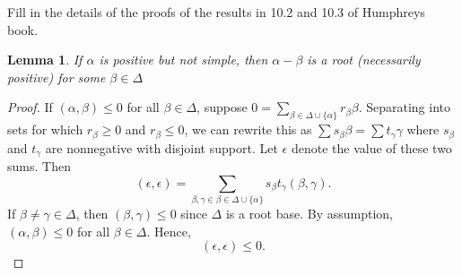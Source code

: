 \documentclass{article}
\newtheorem{lem}[thm]{Lemma}
\begin{document}
\p Fill in the details of the proofs of the results in 10.2 and 10.3 of Humphreys book.

\begin{lem} If $\alpha$ is positive but not simple, then $\alpha - \beta$ is a root 
(necessarily positive) for some $\beta \in \Delta$
\end{lem}
\begin{proof}
If $(\alpha, \beta) \le 0$ for all $\beta \in \Delta$, suppose
$0 = \sum_{\beta \in \Delta \cup \{ \alpha \}} r_\beta \beta$.  Separating into 
sets for which $r_\beta \ge 0$ and $r_\beta \le 0$, we can rewrite this as
$\sum s_\beta \beta = \sum t_\gamma \gamma$ where $s_\beta$ and $t_\gamma$
are nonnegative with disjoint support.  Let $\epsilon$ denote the value
of these two sums.  Then
$$(\epsilon, \epsilon) = \sum_{\beta, \gamma \in \beta \in \Delta \cup \{ \alpha \}} s_\beta t_\gamma (\beta, \gamma).$$
If $\beta \neq \gamma \in \Delta$, then $(\beta, \gamma) \le 0$ since $\Delta$ is a root base. By assumption,
$(\alpha, \beta) \le 0$ for all $\beta \in \Delta$.  Hence, 
$$(\epsilon, \epsilon) \le 0.$$



\end{proof}
\end{document}
